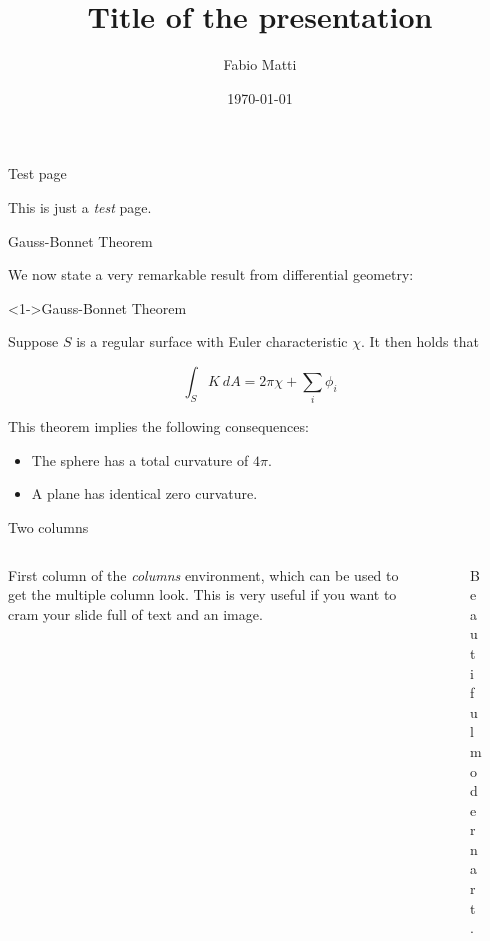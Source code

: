 \documentclass{beamer}
\title{Title of the presentation}
\date{\today}
\author{Fabio Matti}
\begin{document}
\begin{frame}[noframenumbering]

    \titlepage

\end{frame}

\begin{frame}{Test page}

    This is just a \emph{test} page.

\end{frame}

\begin{frame}{Gauss-Bonnet Theorem}

    We now state a very remarkable result from differential geometry:

    \begin{block}<1->{Gauss-Bonnet Theorem}

        Suppose $S$ is a regular surface with Euler characteristic $\chi$.
        It then holds that

        \begin{equation}
            \int_S K~dA = 2\pi\chi + \sum_i \phi_i
            \label{equ:gauss-bonnet}
        \end{equation}

    \end{block}

    This theorem implies the following consequences:

    \begin{itemize}
        \item<2-> The sphere has a total curvature of $4\pi$.
        \item<3-> A plane has identical zero curvature.
    \end{itemize}

\end{frame}

\begin{frame}{Two columns}

    \begin{columns}
    
        \begin{column}[]{0.5\textwidth}
            First column of the \emph{columns} environment, which can be used to
            get the multiple column look. This is very useful if you want to
            cram your slide full of text and an image.
        \end{column}
        \begin{column}[]{0.5\textwidth}
            \begin{figure}[h]
                \centering
                \caption{Beautiful modern art.}
                \label{fig:modern-art}
            \end{figure}
        \end{column}
        
    \end{columns}

\end{frame}
\end{document}
